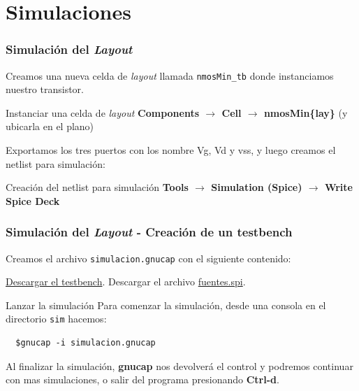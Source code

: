 \documentclass{beamer}
\begin{document}
\section{Simulaciones}
\begin{frame}[fragile]
  \frametitle{Simulación del \emph{Layout}}
  Creamos una nueva celda de \emph{layout} llamada \verb.nmosMin_tb. donde instanciamos nuestro transistor.
  \begin{exampleblock}{Instanciar una celda de \emph{layout}}
\textbf{
Components $\rightarrow$ Cell $\rightarrow$ nmosMin\{lay\}} (y ubicarla en el plano)
  \end{exampleblock}

  Exportamos los tres puertos con los nombre Vg, Vd y vss, y luego creamos el netlist para simulación:
   \begin{exampleblock}{Creación del netlist para simulación}
   \textbf{
Tools $\rightarrow$ Simulation (Spice) $\rightarrow$ Write Spice Deck
}
   \end{exampleblock}

\end{frame}
\begin{frame}[fragile]
  \frametitle{Simulación del \emph{Layout} - Creación de un testbench}
  Creamos el archivo \verb_simulacion.gnucap_ con el siguiente contenido:
  \begin{tiny}
    
\end{tiny}
\href{run:gnucap/simulacion.gnucap}{Descargar el testbench}. Descargar el archivo \href{run:gnucap/fuentes.spi}{fuentes.spi}. 
\end{frame}
\begin{frame}[fragile]{Lanzar la simulación}
  Para comenzar la simulación, desde una consola en el directorio \verb.sim. hacemos:
  \begin{verbatim}
  $gnucap -i simulacion.gnucap
  \end{verbatim}

  Al finalizar la simulación, \textbf{gnucap} nos devolverá el control y podremos continuar con mas simulaciones, o salir del programa presionando \textbf{Ctrl-d}. 
\end{frame}
 
\end{document}
